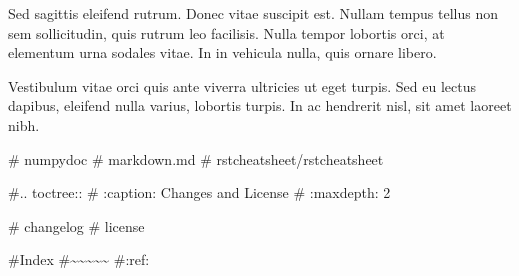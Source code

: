 \documentclass[letterpaper,10pt,english]{sphinxmanual}
\begin{document}
Sed sagittis eleifend rutrum. Donec vitae suscipit est. Nullam tempus tellus
non sem sollicitudin, quis rutrum leo facilisis. Nulla tempor lobortis orci,
at elementum urna sodales vitae. In in vehicula nulla, quis ornare libero.



Vestibulum vitae orci quis ante viverra ultricies ut eget turpis. Sed eu
lectus dapibus, eleifend nulla varius, lobortis turpis. In ac hendrerit nisl,
sit amet laoreet nibh.



\#    numpydoc
\#    markdown.md
\#    rst\sphinxhyphen{}cheatsheet/rst\sphinxhyphen{}cheatsheet

\#.. toctree::
\#    :caption: Changes and License
\#    :maxdepth: 2

\#    change\sphinxhyphen{}log
\#    license

\#Index
\#\textasciitilde{}\textasciitilde{}\textasciitilde{}\textasciitilde{}\textasciitilde{}
\#:ref:



\renewcommand{\indexname}{Index}
\footnotesize\raggedright\printindex
\end{document}
